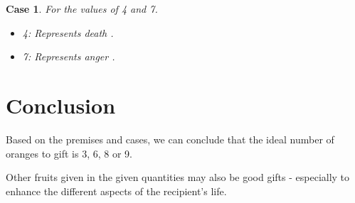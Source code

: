 \documentclass[10pt,a4paper]{article}
\newtheorem{case}[theorem]{Case}
\begin{document}
\begin{case}
    For the values of 4 and 7.

    \begin{itemize}
        \item 4: Represents death \citep{wiki:chinese-numerology}.
        \item 7: Represents anger \citep{wiki:chinese-numerology}.
    \end{itemize}
\end{case}

\section{Conclusion}
Based on the premises and cases, we can conclude that the ideal number of oranges to gift is 3, 6, 8 or 9.

Other fruits given in the given quantities may also be good gifts - especially to enhance the different aspects of the recipient's life.



\end{document}
